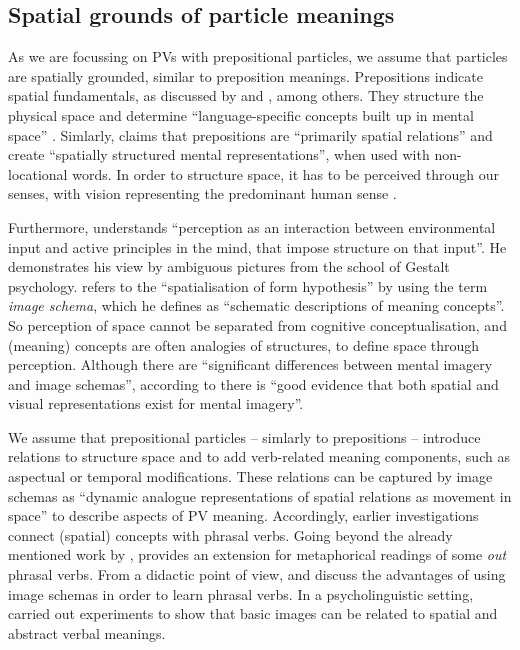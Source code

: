 \documentclass[output=paper]{langsci/langscibook}
\begin{document}
\subsection{Spatial grounds of particle meanings}

As we are focussing on PVs with prepositional particles, we assume
that particles are spatially grounded, similar to preposition
meanings. Prepositions indicate spatial fundamentals, as discussed by
\cite{Herskovits:86} and \cite{Dirven:93}, among others. They
structure the physical space and determine ``language-specific
concepts built up in mental space'' \citep{Dirven:93}. Simlarly, \cite{Gaerdenfors:04}
claims that prepositions are ``primarily spatial relations'' and
create ``spatially structured mental representations'', when used with
non-locational words. In order to structure space, it has to be
perceived through our senses, with vision representing the predominant
human sense \citep{Viberg:83}.

Furthermore, \cite{Jackendoff:83} understands ``perception as an
interaction between environmental input and active principles in the
mind, that impose structure on that input''. He demonstrates his view
by ambiguous pictures from the school of Gestalt psychology.
\cite{Lakoff:87} refers to the ``spatialisation of form hypothesis''
by using the term \textit{image schema}, which he defines as
``schematic descriptions of meaning concepts''. So perception of space
cannot be separated from cognitive conceptualisation, and (meaning)
concepts are often analogies of structures, to define space through
perception. Although there are ``significant differences between
mental imagery and image schemas'', according to
\cite{Gibbs/Colston:95} there is ``good evidence that both spatial and
visual representations exist for mental imagery''.

We assume that prepositional particles -- simlarly to prepositions --
introduce relations to structure space and to add verb-related meaning
components, such as aspectual or temporal modifications. These
relations can be captured by image schemas as ``dynamic analogue
representations of spatial relations as movement in space''
\citep{Gibbs/Colston:95} to describe aspects of PV
meaning. Accordingly, earlier investigations connect (spatial)
concepts with phrasal verbs. Going beyond the already mentioned work
by \cite{Lindner:83}, \cite{Morgan:97} provides an extension for
metaphorical readings of some \textit{out} phrasal verbs. From a
didactic point of view, \cite{Side:90} and \cite{Abreu/Vieira:08}
discuss the advantages of using image schemas in order to learn
phrasal verbs. In a psycholinguistic setting, \cite{RichardsonEtAl:01}
carried out experiments to show that basic images can be related to
spatial and abstract verbal meanings.
\end{document}
